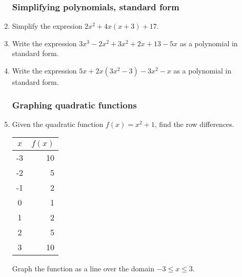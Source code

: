 \documentclass[12pt, oneside]{article}
\begin{document}
\begin{enumerate}
\newpage
\subsubsection*{Simplifying polynomials, standard form}

\item Simplify the expresion $2x^2 + 4x(x+3)+17$.\vspace{4cm}
\item Write the expression $3x^3-2x^2+3x^2+2x+13-5x$ as a polynomial in standard form. \vspace{7cm}

  \item Write the expression $5x+2x(3x^2-3)-3x^2-x$ as a polynomial in standard form.

\newpage


\subsubsection*{Graphing quadratic functions}

\item Given the quadratic function $f(x)=x^2+1$, find the row differences.
  \renewcommand{\arraystretch}{1.6}
    \begin{center}
      \begin{tabular}{|c|r|}
      \hline
      $x$ & $f(x)$\\
      \hline
      -3 & 10 \\
      \hline
      -2 & 5 \\
      \hline
      -1 & 2 \\
      \hline
      0 & 1 \\
      \hline
      1 & 2 \\
      \hline
      2 & 5 \\
      \hline
      3 & 10 \\
      \hline
      \end{tabular}
    \end{center}
Graph the function as a line over the domain $-3 \leq x \leq 3$.

\begin{center} %
\end{center}


\end{enumerate}
\end{document}
